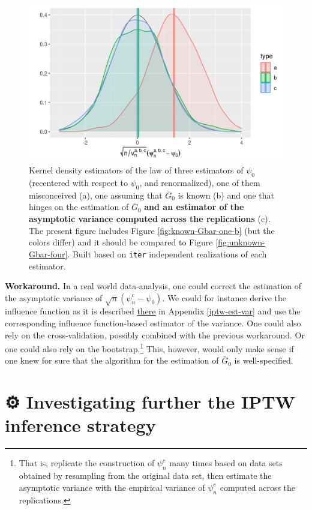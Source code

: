 \documentclass[11pt,openright,twoside]{book}
\newcommand{\gear}{\usebox{\gearbox}\;}
\newcommand{\Gbar}{\bar{G}}
\theoremstyle{definition}
\theoremstyle{definition}
\theoremstyle{definition}
\theoremstyle{remark}
\begin{document}
\begin{figure}

{\centering \includegraphics[width=0.7\linewidth]{img/unknown-Gbar-seven-1} 

}

\caption{Kernel density estimators of the law of three estimators of \(\psi_{0}\) (recentered with respect to \(\psi_{0}\), and renormalized), one of them misconceived (a), one assuming that \(\Gbar_{0}\) is known (b) and one that hinges on the estimation of \(\Gbar_{0}\) \textbf{and an estimator of the asymptotic variance computed across the replications} (c). The present figure includes Figure \ref{fig:known-Gbar-one-b} (but the colors differ) and it should be compared to Figure \ref{fig:unknown-Gbar-four}. Built based on \texttt{iter} independent realizations of each estimator.}\label{fig:unknown-Gbar-seven}
\end{figure}

\textbf{Workaround.} In a real world data-analysis, one could correct the
estimation of the asymptotic variance of \(\sqrt{n} (\psi_{n}^{c} - \psi_{0})\).
We could for instance derive the influence function as it is
described \protect\hyperlink{iptw-est-var}{there} in Appendix \ref{iptw-est-var} and use the
corresponding influence function-based estimator of the variance. One could
also rely on the cross-validation, possibly combined with the previous
workaround. Or one could also rely on the bootstrap.\footnote{That is, replicate the
  construction of \(\psi_{n}^{c}\) many times based on data sets obtained by
  resampling from the original data set, then estimate the asymptotic variance
  with the empirical variance of \(\psi_{n}^{c}\) computed across the
  replications.} This, however, would only make sense if one knew for sure that
the algorithm for the estimation of \(\Gbar_{0}\) is well-specified.

\hypertarget{exo-a-nice-title}{%
\section{\texorpdfstring{⚙ \gear Investigating further the IPTW inference strategy}{⚙ Investigating further the IPTW inference strategy}}\label{exo-a-nice-title}}
\end{document}
